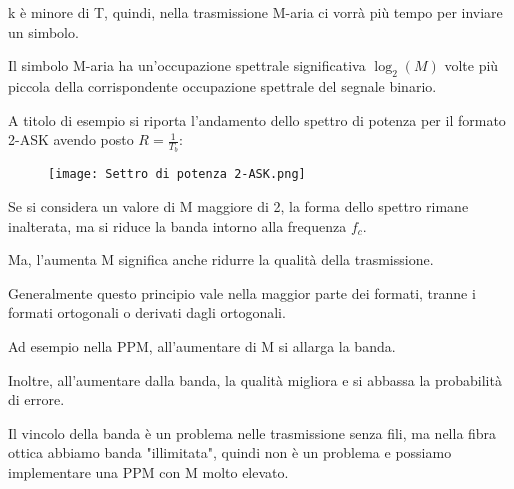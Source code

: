 k è minore di T, quindi, nella trasmissione M-aria ci vorrà più tempo per inviare un simbolo. \newline 

Il simbolo M-aria ha un'occupazione spettrale significativa $\log_{2} (M)$ volte più piccola della corrispondente occupazione spettrale del segnale binario. \newline 

A titolo di esempio si riporta l'andamento dello spettro di potenza per il formato 2-ASK avendo posto $R = \frac{1}{T_b}$: 

\begin{figure}[h]
    \centering
    \texttt{[image: Settro di potenza 2-ASK.png]}
\end{figure}

Se si considera un valore di M maggiore di 2, la forma dello spettro rimane inalterata, ma si riduce la banda intorno alla frequenza $f_c$. \newline 

Ma, l'aumenta M significa anche ridurre la qualità della trasmissione. \newline 

Generalmente questo principio vale nella maggior parte dei formati, 
tranne i formati ortogonali o derivati dagli ortogonali. \newline 

Ad esempio nella PPM, all'aumentare di M si allarga la banda. \newline 

Inoltre, all'aumentare dalla banda, la qualità migliora e si abbassa la probabilità di errore. \newline 

\begin{tcolorbox}
    Il vincolo della banda è un problema nelle trasmissione senza fili, 
    ma nella fibra ottica abbiamo banda "illimitata", quindi non è un problema e possiamo implementare una PPM con M molto elevato.
\end{tcolorbox}

\newpage 
